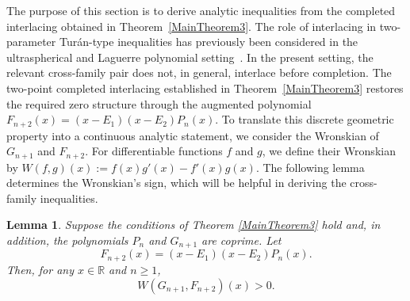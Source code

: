 \documentclass[final,3p,times,12pt]{elsarticle}
\newtheorem{lemma}{Lemma}[section]
\numberwithin{equation}{section}  %
\begin{document}
The purpose of this section is to derive analytic inequalities from the completed
interlacing obtained in Theorem~\ref{MainTheorem3}.  The role of interlacing
in two-parameter Tur\'an-type inequalities has previously been considered in
the ultraspherical and Laguerre polynomial setting~\cite{BustozJMMA1981,BustozIsmail1983SIAM}. In the present setting, the relevant
cross-family pair does not, in general, interlace before completion. The
two-point completed interlacing established in
Theorem~\ref{MainTheorem3} restores the required zero structure through the
augmented polynomial $	F_{n+2}(x)=(x-E_1)(x-E_2)P_n(x).$ 
To translate this discrete geometric property into a continuous analytic
statement, we consider the Wronskian of $G_{n+1}$ and $F_{n+2}$. For differentiable functions $f$ and $g$, we define their Wronskian by $W(f,g)(x):=f(x)g'(x)-f'(x)g(x).$
The following lemma determines the Wronskian's sign, which will be helpful in deriving the cross-family inequalities.
\begin{lemma}\label{lem:Wronskiangeneral}
	Suppose the conditions of Theorem \ref{MainTheorem3} hold and, in addition, the polynomials $P_n$ and $
	G_{n+1}$ are coprime. Let \[F_{n+2}(x)=(x-E_1)(x-E_2)P_n(x).\] Then, for any $x\in \mathbb{R}$ and $n\geq 1$,
	\begin{equation}\label{Wronskian_Neg_twopt}
		W(G_{n+1},F_{n+2} )(x)>0.
	\end{equation}
\end{lemma}
\end{document}
